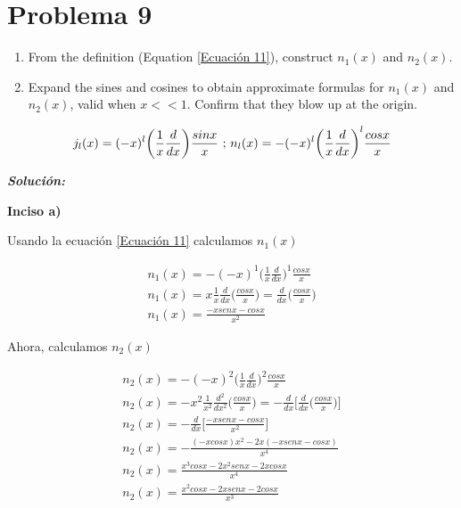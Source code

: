 \documentclass[10pt]{article}
\begin{document}
\medskip

\medskip

\section{Problema 9}

\medskip
\begin{tcolorbox}[colback=gray!10, colframe=black, title=Problem 9]

\begin{enumerate}[label=\alph*)]
    \item From the definition (Equation \ref{Ecuación 11}), construct $n_{1}(x)$ and $n_{2}(x)$.
    \item Expand the sines and cosines to obtain approximate formulas for $n_{1}(x)$
and $n_{2}(x)$, valid when $x << 1$. Confirm that they blow up at the origin.
\end{enumerate}

\begin{equation}
    j_{l}(x)=(-x)^{l}\bigg( \frac{1}{x} \frac{d}{dx}\bigg)\frac{sin x}{x} \\
    \text{   ;   } n_{l}(x)=-(-x)^{l}\bigg( \frac{1}{x}\frac{d}{dx}\bigg)^{l}\frac{cosx}{x}
    \label{Ecuación 11}
\end{equation}

\end{tcolorbox}
\medskip


\Large{\textit{\textbf{Solución:}}}

\medskip

\textbf{Inciso a)}

Usando la ecuación \ref{Ecuación 11} calculamos $n_{1}(x)$ 

\begin{align*}
    n_{1}(x)=-(-x)^{1}\bigg( \frac{1}{x}\frac{d}{dx}\bigg)^{1}\frac{cosx}{x} \\
    n_{1}(x) = x\frac{1}{x}\frac{d}{dx}\bigg(\frac{cosx}{x}\bigg) = \frac{d}{dx}\bigg(\frac{cosx}{x}\bigg) \\
    n_{1}(x) = \frac{-xsenx-cosx}{x^{2}}
\end{align*}

Ahora, calculamos $n_{2}(x)$

\begin{align*}
    n_{2}(x)=-(-x)^{2}\bigg( \frac{1}{x}\frac{d}{dx}\bigg)^{2}\frac{cosx}{x} \\
    n_{2}(x) = -x^{2}\frac{1}{x^{2}}\frac{d^{2}}{dx^{2}}\bigg(\frac{cosx}{x}\bigg) = -\frac{d}{dx}\bigg[\frac{d}{dx}\bigg(\frac{cosx}{x}\bigg)\bigg] \\
    n_{2}(x) = -\frac{d}{dx}\bigg[\frac{-xsenx-cosx}{x^{2}}\bigg] \\
    n_{2}(x) =-\frac{(-xcosx)x^{2}-2x(-xsenx-cosx)}{x^{4}} \\
    n_{2}(x)= \frac{x^{3}cosx-2x^{2}senx-2xcosx}{x^{4}} \\
    n_{2}(x)=\frac{x^{2}cosx-2xsenx-2cosx}{x^{3}}
\end{align*}
\end{document}
